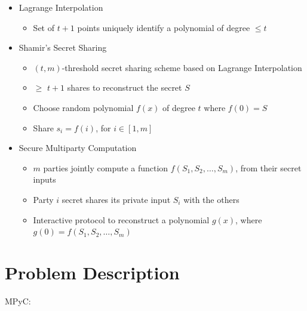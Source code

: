 \begin{itemize}
\tightlist
\item
  Lagrange Interpolation

  \begin{itemize}
  \tightlist
  \item
    Set of \(t+1\) points uniquely identify a polynomial of degree
    \(\leq t\)
  \end{itemize}
\item
  Shamir's Secret Sharing

  \begin{itemize}
  \tightlist
  \item
    \((t, m)\)-threshold secret sharing scheme based on Lagrange
    Interpolation
  \item
    \(\geq\) \(t+1\) shares to reconstruct the secret \(S\)
  \item
    Choose random polynomial \(f(x)\) of degree \(t\) where \(f(0) = S\)
  \item
    Share \(s_i = f(i)\), for \(i \in [1,m]\)
  \end{itemize}
\item
  Secure Multiparty Computation

  \begin{itemize}
  \tightlist
  \item
    \(m\) parties jointly compute a function
    \(f(S_{1},S_{2},\dots,S_{m})\), from their secret inputs
  \item
    Party \(i\) secret shares its private input \(S_{i}\) with the
    others
  \item
    Interactive protocol to reconstruct a polynomial \(g(x)\), where
    \(g(0)=f(S_1, S_2, \dots, S_m)\)
  \end{itemize}
\end{itemize}

\hypertarget{problem-description}{%
\chapter{Problem Description}\label{problem-description}}

MPyC:

